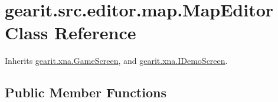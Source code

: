 \hypertarget{classgearit_1_1src_1_1editor_1_1map_1_1_map_editor}{\section{gearit.\+src.\+editor.\+map.\+Map\+Editor Class Reference}
\label{classgearit_1_1src_1_1editor_1_1map_1_1_map_editor}
}


Inherits \hyperlink{classgearit_1_1xna_1_1_game_screen}{gearit.\+xna.\+Game\+Screen}, and \hyperlink{interfacegearit_1_1xna_1_1_i_demo_screen}{gearit.\+xna.\+I\+Demo\+Screen}.

\subsection*{Public Member Functions}

